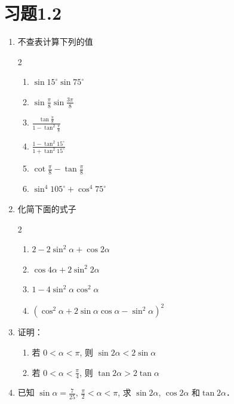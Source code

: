 \section*{习题1.2}
\begin{enumerate}
    \item 不查表计算下列的值
\begin{multicols}{2}
\begin{enumerate}
    \item $\sin 15^{\circ} \sin 75^{\circ}$
    \item $\sin \frac{\pi}{8} \sin \frac{3 \pi}{8}$
    \item $\frac{\tan\frac{\pi}{8}}{1-\tan^2\frac{\pi}{8}}$
    \item $\frac{1-\tan^2 15^{\circ}}{1+\tan^2 15^{\circ}}$
    \item $\cot\frac{\pi}{8}-\tan\frac{\pi}{8}$
    \item $\sin^{4} 105^{\circ}+\cos^{4} 75^{\circ}$
\end{enumerate}
\end{multicols}

\item 化简下面的式子
\begin{multicols}{2}
    \begin{enumerate}
        \item  $2-2 \sin ^{2} \alpha+\cos 2 \alpha$
        \item  $\cos 4 \alpha+2 \sin ^{2} 2 \alpha$
        \item $1-4 \sin ^{2} \alpha \cos ^{2} \alpha$
\item $\left(\cos ^{2} \alpha+2 \sin \alpha \cos \alpha-\sin ^{2} \alpha\right)^{2}$
\end{enumerate}
\end{multicols}

\item 证明：
\begin{enumerate}
    \item 若 $0<\alpha<\pi$, 则 $\sin 2 \alpha<2 \sin \alpha$
    \item 若 $0<\alpha<\frac{\pi}{4}$, 则 $\tan 2 \alpha>2\tan  \alpha$
\end{enumerate}

\item  已知 $\sin \alpha=\frac{7}{25}$, $\frac{\pi}{2}<\alpha<\pi$,
求 $\sin 2 \alpha$, $\cos 2 \alpha$ 和$\tan 2 \alpha$．


\end{enumerate}
